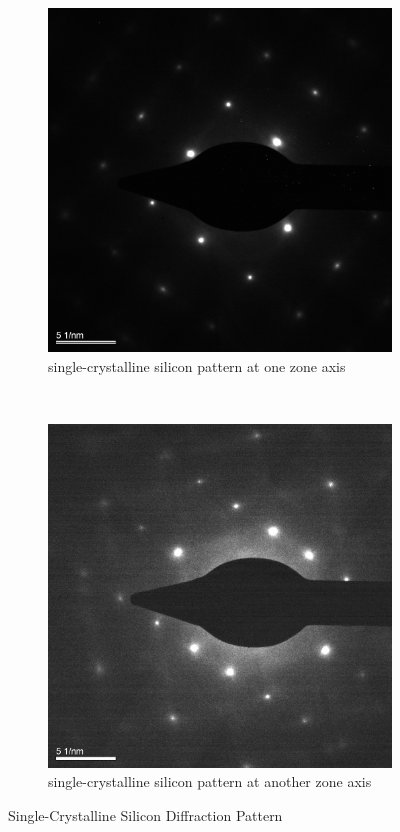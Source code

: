 \documentclass[12pt,a4paper]{article}
\begin{document}
\begin{figure}[htbp]
  \centering
    \begin{subfigure}[b]{0.45\textwidth}
    \includegraphics[width=\textwidth]{data/Image3 Si_Diff_Zone1.png}
    \caption{single-crystalline silicon pattern at one zone axis}
    \label{fig:si1}
  \end{subfigure}%
  ~
  \begin{subfigure}[b]{0.45\textwidth}
    \includegraphics[width=\textwidth]{data/Image4 Si_Diff_Zone2.png}
    \caption{single-crystalline silicon pattern at another zone axis}
    \label{fig:si2}
  \end{subfigure}
  \caption{Single-Crystalline Silicon Diffraction Pattern}
  \label{fig:Silicon}
\end{figure}
\end{document}
